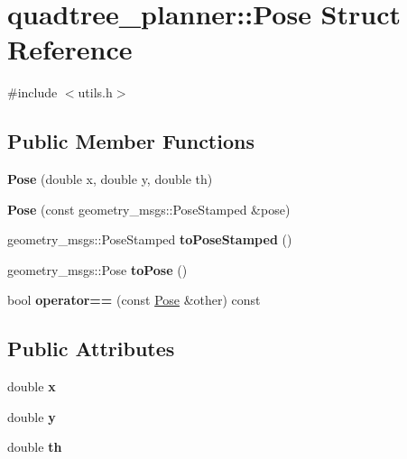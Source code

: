 \hypertarget{structquadtree__planner_1_1Pose}{}\section{quadtree\+\_\+planner\+:\+:Pose Struct Reference}
\label{structquadtree__planner_1_1Pose}


{\ttfamily \#include $<$utils.\+h$>$}

\subsection*{Public Member Functions}
\begin{DoxyCompactItemize}
\item 
\mbox{\label{structquadtree__planner_1_1Pose_ac5cb9edb234c265892e1aaf25a09c126}} 
{\bfseries Pose} (double x, double y, double th)
\item 
\mbox{\label{structquadtree__planner_1_1Pose_ab15807e852317d6acee928d2a02775c4}} 
{\bfseries Pose} (const geometry\+\_\+msgs\+::\+Pose\+Stamped \&pose)
\item 
\mbox{\label{structquadtree__planner_1_1Pose_a89717ec05a3c8cf79b4163a2a73231dc}} 
geometry\+\_\+msgs\+::\+Pose\+Stamped {\bfseries to\+Pose\+Stamped} ()
\item 
\mbox{\label{structquadtree__planner_1_1Pose_abbba628215c1b1b4c167cb69de949588}} 
geometry\+\_\+msgs\+::\+Pose {\bfseries to\+Pose} ()
\item 
\mbox{\label{structquadtree__planner_1_1Pose_a5dcf7f0ddb54e6d5ccc7df7b364299bf}} 
bool {\bfseries operator==} (const \hyperlink{structquadtree__planner_1_1Pose}{Pose} \&other) const
\end{DoxyCompactItemize}
\subsection*{Public Attributes}
\begin{DoxyCompactItemize}
\item 
\mbox{\label{structquadtree__planner_1_1Pose_a6ce521b9e7aa2df629f50ed7842a2892}} 
double {\bfseries x}
\item 
\mbox{\label{structquadtree__planner_1_1Pose_a4ab82a425c9ebf3d5f621705e0822663}} 
double {\bfseries y}
\item 
\mbox{\label{structquadtree__planner_1_1Pose_a9bbe15f58cd108cbdfc5c9e6c33e3071}} 
double {\bfseries th}
\end{DoxyCompactItemize}
